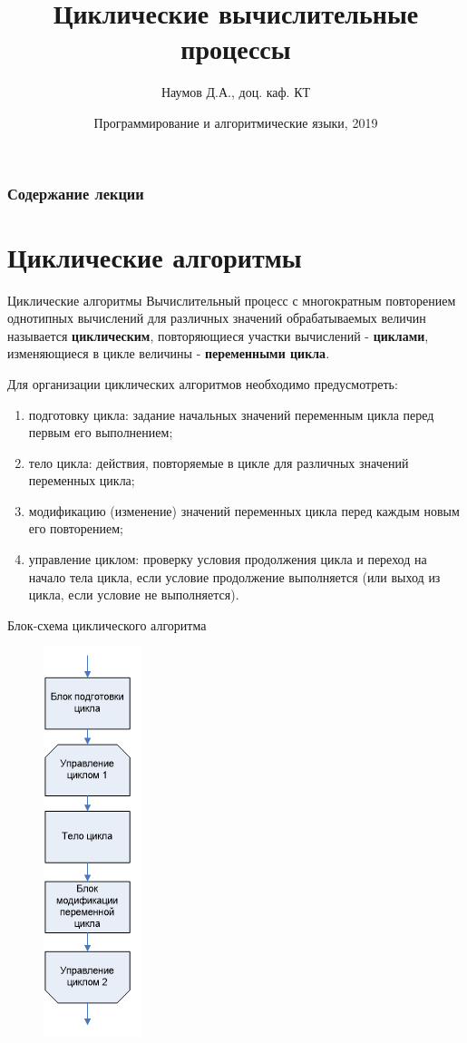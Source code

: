 \documentclass{beamer}
\title[Основы языка Pascal]{Циклические вычислительные процессы}
\author{Наумов Д.А., доц. каф. КТ}
\date[17.10.2019] {Программирование и алгоритмические языки, 2019}
\begin{document}
\begin{frame}
  \titlepage
\end{frame}
  
\begin{frame}
  \frametitle{Содержание лекции}
  \tableofcontents  
\end{frame}

\section{Циклические алгоритмы}

\begin{frame}{Циклические алгоритмы}
Вычислительный процесс с многократным повторением однотипных вычислений для различных значений обрабатываемых величин называется \textbf{циклическим}, повторяющиеся участки вычислений - \textbf{циклами}, изменяющиеся в цикле величины - \textbf{переменными цикла}.

Для организации циклических алгоритмов необходимо предусмотреть:
\begin{enumerate}
\item подготовку цикла: задание начальных значений переменным цикла перед первым его выполнением;
\item тело цикла: действия, повторяемые в цикле для различных значений переменных цикла;
\item модификацию (изменение) значений переменных цикла перед каждым новым его повторением;
\item управление циклом: проверку условия продолжения цикла и переход на начало тела цикла, если условие продолжение выполняется (или выход из цикла, если условие не выполняется).
\end{enumerate}
\end{frame} 

\begin{frame}{Блок-схема циклического алгоритма}
\begin{figure}[h]
\centering
\includegraphics[scale=0.6]{images/lec04-pic01.png}
\end{figure}
\end{frame}
\end{document}
